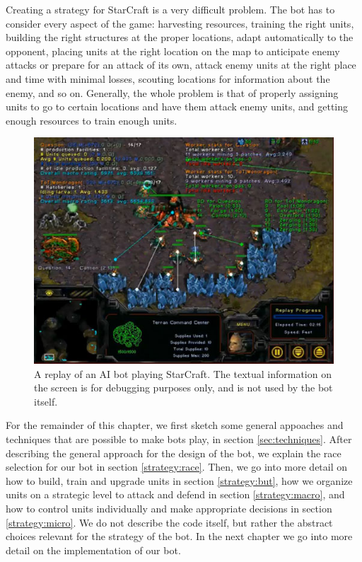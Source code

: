 Creating a strategy for StarCraft is a very difficult problem. The bot has to consider every aspect of the game: harvesting resources, training the right units, building the right structures at the proper locations, adapt automatically to the opponent, placing units at the right location on the map to anticipate enemy attacks or prepare for an attack of its own, attack enemy units at the right place and time with minimal losses, scouting locations for information about the enemy, and so on. Generally, the whole problem is that of properly assigning units to go to certain locations and have them attack enemy units, and getting enough resources to train enough units.

\begin{figure}
\centering
\includegraphics[scale=0.6]{bwapi.jpg}
\caption{\label{fig:bwapi} A replay of an AI bot playing StarCraft. The textual information on the screen is for debugging purposes only, and is not used by the bot itself.}
\end{figure}


For the remainder of this chapter, we first sketch some general appoaches and techniques that are possible to make bots play, in section \ref{sec:techniques}. After describing the general approach for the design of the bot, we explain the race selection for our bot in section \ref{strategy:race}. Then, we go into more detail on how to build, train and upgrade units in section \ref{strategy:but}, how we organize units on a strategic level to attack and defend in section \ref{strategy:macro}, and how to control units individually and make appropriate decisions in section \ref{strategy:micro}. We do not describe the code itself, but rather the abstract choices relevant for the strategy of the bot. In the next chapter we go into more detail on the implementation of our bot.


